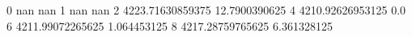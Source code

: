 0 nan nan
1 nan nan
2 4223.71630859375 12.7900390625
4 4210.92626953125 0.0
6 4211.99072265625 1.064453125
8 4217.28759765625 6.361328125
